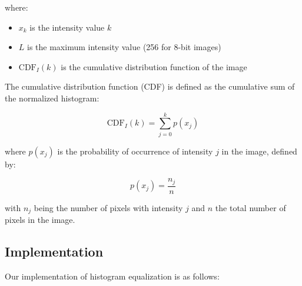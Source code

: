 \documentclass[12pt,a4paper]{article}
\begin{document}
where:
\begin{itemize}
    \item $x_k$ is the intensity value $k$
    \item $L$ is the maximum intensity value (256 for 8-bit images)
    \item $\text{CDF}_I(k)$ is the cumulative distribution function of the image
\end{itemize}

The cumulative distribution function (CDF) is defined as the cumulative sum of the normalized histogram:

\begin{equation}
    \text{CDF}_I(k) = \sum_{j=0}^{k} p(x_j)
\end{equation}

where $p(x_j)$ is the probability of occurrence of intensity $j$ in the image, defined by:

\begin{equation}
    p(x_j) = \frac{n_j}{n}
\end{equation}

with $n_j$ being the number of pixels with intensity $j$ and $n$ the total number of pixels in the image.

\subsection{Implementation}

Our implementation of histogram equalization is as follows:
\end{document}
